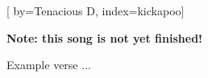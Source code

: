 
[%
    by={Tenacious D},
    index={kickapoo}]


    \label{kickapoo}

    \textbf{Note: this song is not yet finished!}

    \beginverse
        Example verse ...
    \endverse
\endsong
